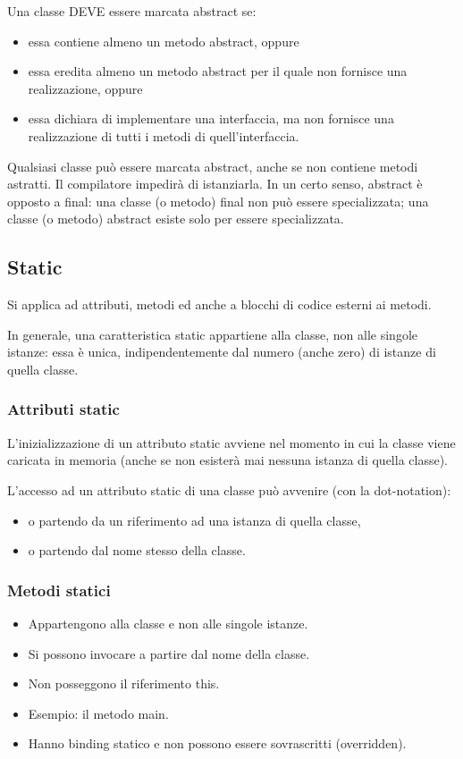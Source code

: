 \documentclass[10pt]{article}
\begin{document}
Una classe DEVE essere marcata abstract se:
\begin{itemize}
    \item essa contiene almeno un metodo abstract, oppure
    \item essa eredita almeno un metodo abstract per il quale non fornisce
    una realizzazione, oppure
    \item essa dichiara di implementare una interfaccia,
    ma non fornisce una realizzazione di tutti i metodi di
    quell’interfaccia.
\end{itemize}
Qualsiasi classe può essere marcata abstract, anche se non contiene
metodi astratti. Il compilatore impedirà di istanziarla.
In un certo senso, abstract è opposto a final: una classe (o metodo)
final non può essere specializzata; una classe (o metodo) abstract
esiste solo per essere specializzata.
\subsection{Static}
Si applica ad attributi, metodi ed anche a blocchi di codice esterni ai metodi.

In generale, una caratteristica static appartiene alla classe, non alle singole istanze: essa è unica, indipendentemente dal numero (anche zero) di istanze di quella classe.
\subsubsection{Attributi static}
L’inizializzazione di un attributo static avviene nel momento in
cui la classe viene caricata in memoria (anche se non esisterà mai
nessuna istanza di quella classe).

L’accesso ad un attributo static di una classe può avvenire (con la dot-notation):
\begin{itemize}
    \item o partendo da un riferimento ad una istanza di quella classe,
    \item o partendo dal nome stesso della classe.
\end{itemize}
\subsubsection{Metodi statici}
\begin{itemize}
    \item Appartengono alla classe e non alle singole istanze.
    \item Si possono invocare a partire dal nome della classe.
    \item Non posseggono il riferimento this.
    \item Esempio: il metodo main.
    \item Hanno binding statico e non possono essere sovrascritti (overridden).
\end{itemize}
\end{document}
